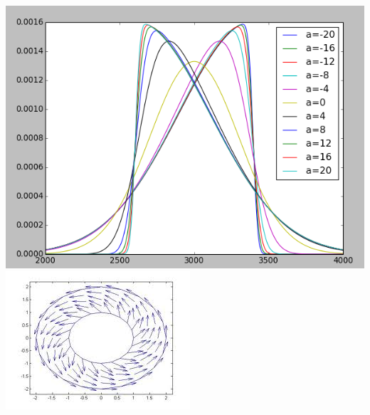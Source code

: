 \documentclass[slidestop,compress,mathserif,color,12pt]{beamer}
\begin{document}
\begin{frame}
\begin{minipage}{0.33\linewidth}
\includegraphics[width=0.49\linewidth]{gg2.png}\\
\includegraphics[width=0.8\linewidth]{ring.jpg}
\end{minipage}
\end{frame}




%
%
%
%
%
\end{document}
